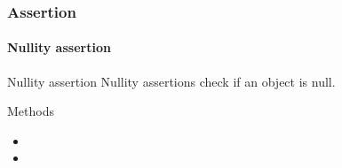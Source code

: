 \begin{frame}[parent={concept:assertion}, hasprev=false, hasnext=false]
\frametitle{Assertion}
\framesubtitle{Nullity assertion}
\label{concept:junit-nullity-assertion}
\label{concept:nullity-assertion}

\begin{block:concept}{Nullity assertion}
Nullity assertions check if an object is null.
\end{block:concept}

\begin{block:fact}{Methods}
\begin{itemize}
	\item {}
	\item {}
\end{itemize}
\end{block:fact}

\hfill
{}
\end{frame}